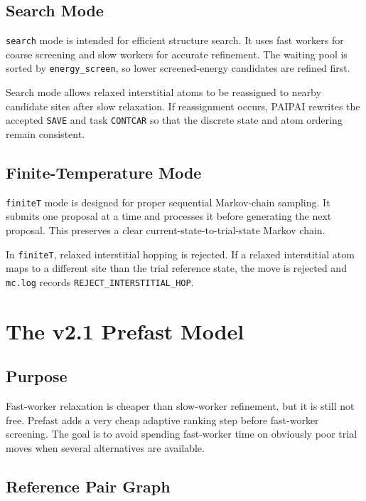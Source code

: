 \documentclass[11pt]{article}
\newcommand{\PAIPAI}{\textsc{PAIPAI}}
\begin{document}
\subsection{Search Mode}

\texttt{search} mode is intended for efficient structure search.
It uses fast workers for coarse screening and slow workers for accurate refinement.
The waiting pool is sorted by \texttt{energy\_screen}, so lower screened-energy candidates are refined first.

Search mode allows relaxed interstitial atoms to be reassigned to nearby candidate sites after slow relaxation.
If reassignment occurs, \PAIPAI{} rewrites the accepted \texttt{SAVE} and task \texttt{CONTCAR} so that the discrete state and atom ordering remain consistent.

\subsection{Finite-Temperature Mode}

\texttt{finiteT} mode is designed for proper sequential Markov-chain sampling.
It submits one proposal at a time and processes it before generating the next proposal.
This preserves a clear current-state-to-trial-state Markov chain.

In \texttt{finiteT}, relaxed interstitial hopping is rejected.
If a relaxed interstitial atom maps to a different site than the trial reference state, the move is rejected and \texttt{mc.log} records \texttt{REJECT\_INTERSTITIAL\_HOP}.

\section{The v2.1 Prefast Model}

\subsection{Purpose}

Fast-worker relaxation is cheaper than slow-worker refinement, but it is still not free.
Prefast adds a very cheap adaptive ranking step before fast-worker screening.
The goal is to avoid spending fast-worker time on obviously poor trial moves when several alternatives are available.

\subsection{Reference Pair Graph}
\end{document}
